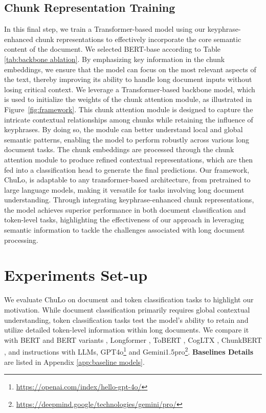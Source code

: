 \documentclass[11pt]{article}
\begin{document}
\subsection{Chunk Representation Training}
In this final step, we train a Transformer-based model using our keyphrase-enhanced chunk representations to effectively incorporate the core semantic content of the document. We selected BERT-base according to Table \ref{tab:backbone ablation}. By emphasizing key information in the chunk embeddings, we ensure that the model can focus on the most relevant aspects of the text, thereby improving its ability to handle long document inputs without losing critical context.
We leverage a Transformer-based backbone model, which is used to initialize the weights of the chunk attention module, as illustrated in Figure~\ref{fig:framework}. This chunk attention module is designed to capture the intricate contextual relationships among chunks while retaining the influence of keyphrases. By doing so, the module can better understand local and global semantic patterns, enabling the model to perform robustly across various long document tasks. The chunk embeddings are processed through the chunk attention module to produce refined contextual representations, which are then fed into a classification head to generate the final predictions.
Our framework, ChuLo, is adaptable to any transformer-based architecture, from pretrained to large language models, making it versatile for tasks involving long document understanding. Through integrating keyphrase-enhanced chunk representations, the model achieves superior performance in both document classification and token-level tasks, highlighting the effectiveness of our approach in leveraging semantic information to tackle the challenges associated with long document processing.


\section{Experiments Set-up}
We evaluate ChuLo on document and token classification tasks to highlight our motivation. While document classification primarily requires global contextual understanding, token classification tasks test the model's ability to retain and utilize detailed token-level information within long documents. We compare it with BERT \citep{kenton2019bert} and BERT variants \citep{park2022efficient}, Longformer \citep{beltagy2020longformer}, ToBERT \citep{pappagari2019hierarchical}, CogLTX \citep{ding2020cogltx}, ChunkBERT \citep{jaiswal2023breaking}, and instructions with LLMs, GPT4o\footnote{\url{https://openai.com/index/hello-gpt-4o/}} and Gemini1.5pro\footnote{\url{https://deepmind.google/technologies/gemini/pro/}}. \textbf{Baselines Details} are listed in Appendix \ref{app:baseline models}.
\end{document}

